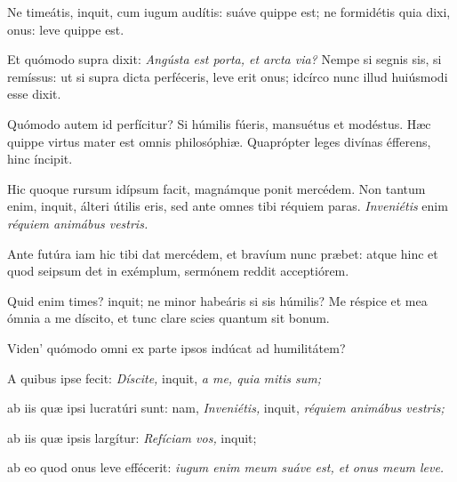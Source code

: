 {{\noindent Ne timeátis, inquit, cum iugum audítis: suáve quippe est; ne formidétis quia dixi, onus: leve quippe est.

\noindent Et quómodo supra dixit: \emph{Angústa est porta, et arcta via?} Nempe si segnis sis, si remíssus: ut si supra dicta perféceris, leve erit onus; idcírco nunc illud huiúsmodi esse dixit.

\noindent Quómodo autem id perfícitur? Si húmilis fúeris, mansuétus et modéstus. Hæc quippe virtus mater est omnis philosóphiæ. Quaprópter leges divínas éfferens, hinc íncipit.

\noindent Hic quoque rursum idípsum facit, magnámque ponit mercédem. Non tantum enim, inquit, álteri útilis eris, sed ante omnes tibi réquiem paras. \emph{Inveniétis} enim \emph{réquiem animábus vestris.}

\noindent Ante futúra iam hic tibi dat mercédem, et bravíum nunc præbet: atque hinc et quod seipsum det in exémplum, sermónem reddit acceptiórem.

\noindent Quid enim times? inquit; ne minor habeáris si sis húmilis? Me réspice et mea ómnia a me díscito, et tunc clare scies quantum sit bonum.

\noindent Viden' quómodo omni ex parte ipsos indúcat ad humilitátem?

\noindent A quibus ipse fecit: \emph{Díscite,} inquit, \emph{a me, quia mitis sum;}

\noindent ab iis quæ ipsi lucratúri sunt: nam, \emph{Inveniétis,} inquit, \emph{réquiem animábus vestris;}

\noindent ab iis quæ ipsis largítur: \emph{Refíciam vos,} inquit;

\noindent ab eo quod onus leve effécerit: \emph{iugum enim meum suáve est, et onus meum leve.}}}

